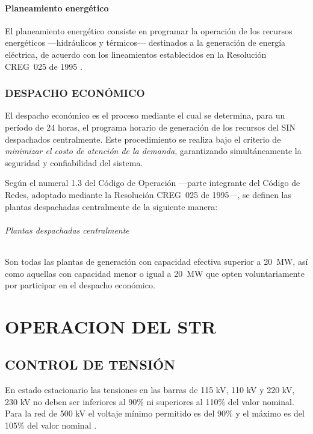 \documentclass[a5paper]{book}%
\begin{document}
\subsection{Planeamiento energético}

El planeamiento energético consiste en programar la operación de los recursos energéticos —hidráulicos y térmicos— destinados a la generación de energía eléctrica, de acuerdo con los lineamientos establecidos en la Resolución CREG~025 de 1995 \cite{CREG0251995}.

\section{DESPACHO ECONÓMICO}

El despacho económico es el proceso mediante el cual se determina, para un período de 24 horas, el programa horario de generación de los recursos del \ac{SIN} despachados centralmente.  
Este procedimiento se realiza bajo el criterio de \textit{minimizar el costo de atención de la demanda}, garantizando simultáneamente la seguridad y confiabilidad del sistema.

Según el numeral 1.3 del Código de Operación —parte integrante del Código de Redes, adoptado mediante la Resolución CREG~025 de 1995—, se definen las plantas despachadas centralmente de la siguiente manera:

\paragraph{Plantas despachadas centralmente}

Son todas las plantas de generación con capacidad efectiva superior a 20~MW, así como aquellas con capacidad menor o igual a 20~MW que opten voluntariamente por participar en el despacho económico.

\part{OPERACION DEL STR}

\chapter{CONTROL DE TENSIÓN}

En estado estacionario las tensiones en las barras de 115 kV,
  110 kV y 220 kV, 230 kV no deben ser inferiores al 90\% ni
  superiores al 110\% del valor nominal. Para la red de 500 kV el
  voltaje mínimo permitido es del 90\% y el máximo es del 105\% del
  valor nominal \cite{CREG0251995}.\\\\
\end{document}
